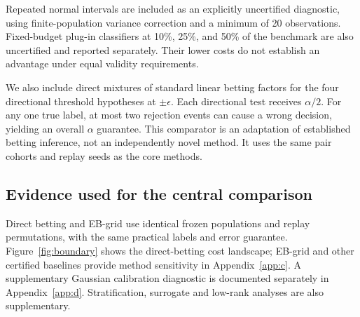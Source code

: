 Repeated normal intervals are included as an explicitly uncertified diagnostic, using finite-population variance correction and a minimum of 20 observations. Fixed-budget plug-in classifiers at 10\%, 25\%, and 50\% of the benchmark are also uncertified and reported separately. Their lower costs do not establish an advantage under equal validity requirements.

We also include direct mixtures of standard linear betting factors for the four directional threshold hypotheses at \(\pm\epsilon\). Each directional test receives \(\alpha/2\). For any one true label, at most two rejection events can cause a wrong decision, yielding an overall \(\alpha\) guarantee. This comparator is an adaptation of established betting inference, not an independently novel method. It uses the same pair cohorts and replay seeds as the core methods.

\subsection{Evidence used for the central comparison}\label{evidence-used-for-the-central-comparison}

Direct betting and EB-grid use identical frozen populations and replay permutations, with the same practical labels and error guarantee. Figure~\ref{fig:boundary} shows the direct-betting cost landscape; EB-grid and other certified baselines provide method sensitivity in Appendix~\ref{app:c}. A supplementary Gaussian calibration diagnostic is documented separately in Appendix~\ref{app:d}. Stratification, surrogate and low-rank analyses are also supplementary.
